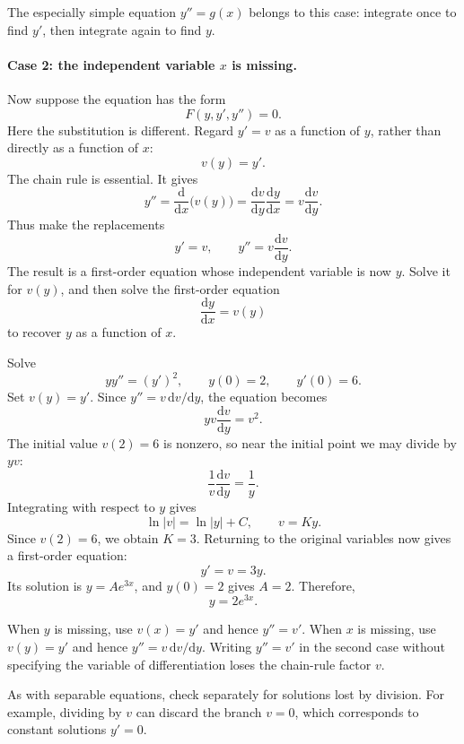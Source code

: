 The especially simple equation \(y''=g(x)\) belongs to this case: integrate
once to find \(y'\), then integrate again to find \(y\).

\paragraph{Case 2: the independent variable \(x\) is missing.}
Now suppose the equation has the form
\[
    F(y,y',y'')=0.
\]
Here the substitution is different.  Regard \(y'=v\) as a function of
\(y\), rather than directly as a function of \(x\):
\[
    v(y)=y'.
\]
The chain rule is essential.  It gives
\[
    y''
    =\frac{\mathrm{d}}{\mathrm{d}x}\bigl(v(y)\bigr)
    =\frac{\mathrm{d}v}{\mathrm{d}y}
       \frac{\mathrm{d}y}{\mathrm{d}x}
    =v\frac{\mathrm{d}v}{\mathrm{d}y}.
\]
Thus make the replacements
\[
    \boxed{
        y'=v,
        \qquad
        y''=v\frac{\mathrm{d}v}{\mathrm{d}y}.}
\]
The result is a first-order equation whose independent variable is now
\(y\).  Solve it for \(v(y)\), and then solve the first-order equation
\[
    \frac{\mathrm{d}y}{\mathrm{d}x}=v(y)
\]
to recover \(y\) as a function of \(x\).

\begin{eg}
    Solve
    \[
        yy''=(y')^2,
        \qquad y(0)=2,
        \qquad y'(0)=6.
    \]
    Set \(v(y)=y'\).  Since
    \(y''=v\,\mathrm{d}v/\mathrm{d}y\), the equation becomes
    \[
        yv\frac{\mathrm{d}v}{\mathrm{d}y}=v^2.
    \]
    The initial value \(v(2)=6\) is nonzero, so near the initial point we
    may divide by \(yv\):
    \[
        \frac{1}{v}\frac{\mathrm{d}v}{\mathrm{d}y}=\frac{1}{y}.
    \]
    Integrating with respect to \(y\) gives
    \[
        \ln|v|=\ln|y|+C,
        \qquad
        v=Ky.
    \]
    Since \(v(2)=6\), we obtain \(K=3\).  Returning to the original
    variables now gives a first-order equation:
    \[
        y'=v=3y.
    \]
    Its solution is \(y=Ae^{3x}\), and \(y(0)=2\) gives \(A=2\).
    Therefore,
    \[
        \boxed{y=2e^{3x}}.
    \]
\end{eg}

\begin{remark}
    When \(y\) is missing, use \(v(x)=y'\) and hence \(y''=v'\).  When
    \(x\) is missing, use \(v(y)=y'\) and hence
    \(y''=v\,\mathrm{d}v/\mathrm{d}y\).  Writing \(y''=v'\) in the second
    case without specifying the variable of differentiation loses the
    chain-rule factor \(v\).

    As with separable equations, check separately for solutions lost by
    division.  For example, dividing by \(v\) can discard the branch
    \(v=0\), which corresponds to constant solutions \(y'=0\).
\end{remark}

